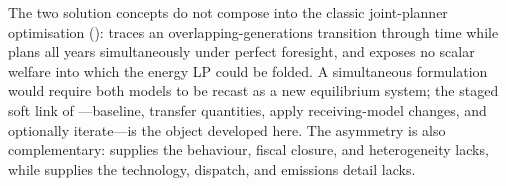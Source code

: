 The two solution concepts do not compose into the classic joint-planner optimisation
():
\OGCore{} traces an overlapping-generations transition through time while \OSeMOSYS{}
plans all years simultaneously under perfect foresight, and \OGCore{} exposes no scalar
welfare into which the energy LP could be folded. A simultaneous formulation would
require both models to be recast as a new equilibrium system; the staged soft link of
---baseline, transfer quantities, apply receiving-model changes, and
optionally iterate---is the object developed here. The
asymmetry is also complementary: \OGCore{} supplies the behaviour, fiscal closure, and
heterogeneity \OSeMOSYS{} lacks, while \OSeMOSYS{} supplies the technology, dispatch, and
emissions detail \OGCore{} lacks.
